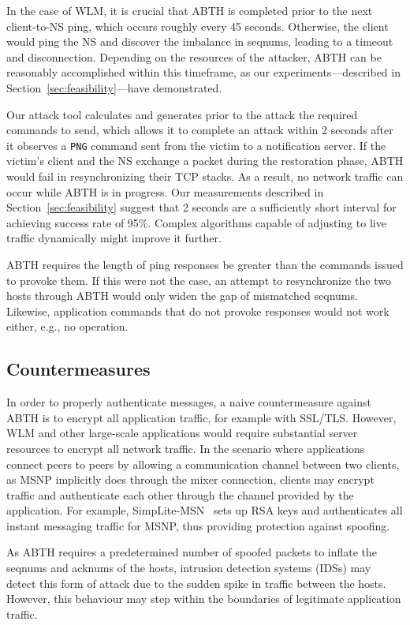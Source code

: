 \documentclass{sig-alternate}
\begin{document}
In the case of WLM, it is crucial that ABTH is completed prior to the next client-to-NS ping, which occurs roughly every 45 seconds.
Otherwise, the client would ping the NS and discover the imbalance in seqnums, leading to a timeout and disconnection.
Depending on the resources of the attacker, ABTH can be reasonably accomplished within this timeframe, as our experiments---described in Section~\ref{sec:feasibility}---have demonstrated.

Our attack tool calculates and generates prior to the attack the required commands to send, which allows it to complete an attack within 2 seconds after it observes a \texttt{PNG} command sent from the victim to a notification server.
If the victim's client and the NS exchange a packet during the restoration phase, ABTH would fail in resynchronizing their TCP stacks.
As a result, no network traffic can occur while ABTH is in progress. 
Our measurements described in Section~\ref{sec:feasibility} suggest that 2 seconds are a sufficiently short interval for achieving success rate of 95\%.
Complex algorithms capable of adjusting to live traffic dynamically might improve it further. 

ABTH requires the length of ping responses be greater than the commands issued to provoke them.
If this were not the case, an attempt to resynchronize the two hosts through ABTH would only widen the gap of mismatched seqnums.
Likewise, application commands that do not provoke responses would not work either, e.g., no operation.

\subsection{Countermeasures}

In order to properly authenticate messages, a naive countermeasure against ABTH is to encrypt all application traffic, for example with SSL/TLS.
However, WLM and other large-scale applications would require substantial server resources to encrypt all network traffic.
In the scenario where applications connect peers to peers by allowing a communication channel between two clients, as MSNP implicitly does through the mixer connection, clients may encrypt traffic and authenticate each other through the channel provided by the application.
For example, SimpLite-MSN~\cite{secway:url} sets up RSA keys and authenticates all instant messaging traffic for MSNP, thus providing protection against spoofing.

As ABTH requires a predetermined number of spoofed packets to inflate the seqnums and acknums of the hosts, intrusion detection systems (IDSs) may detect this form of attack due to the sudden spike in traffic between the hosts.
However, this behaviour may step within the boundaries of legitimate application traffic.
\end{document}
